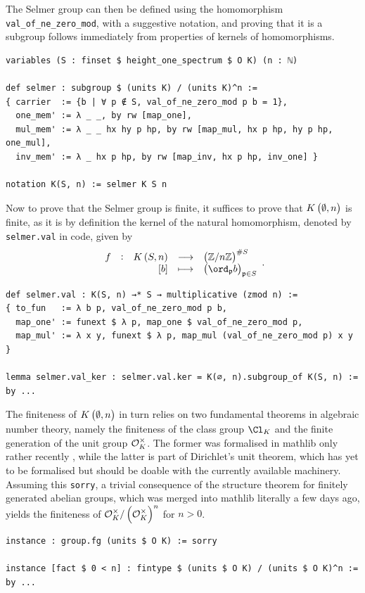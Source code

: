 \pagebreak

The Selmer group can then be defined using the homomorphism \texttt{val\_of\_ne\_zero\_mod}, with a suggestive notation, and proving that it is a subgroup follows immediately from properties of kernels of homomorphisms.

\begin{lstlisting}[frame=single]
variables (S : finset $ height_one_spectrum $ O K) (n : ℕ)

def selmer : subgroup $ (units K) / (units K)^n :=
{ carrier  := {b | ∀ p ∉ S, val_of_ne_zero_mod p b = 1},
  one_mem' := λ _ _, by rw [map_one],
  mul_mem' := λ _ _ hx hy p hp, by rw [map_mul, hx p hp, hy p hp, one_mul],
  inv_mem' := λ _ hx p hp, by rw [map_inv, hx p hp, inv_one] }

notation K(S, n) := selmer K S n
\end{lstlisting}

Now to prove that the Selmer group is finite, it suffices to prove that $ K\br{\emptyset, n} $ is finite, as it is by definition the kernel of the natural homomorphism, denoted by \texttt{selmer.val} in code, given by
$$ \function[f]{K\br{S, n}}{\br{\ZZ / n\ZZ}^{\#S}}{\sbr{b}}{\br{\ord_\ppp b}_{\ppp \in S}}. $$

\begin{lstlisting}[frame=single]
def selmer.val : K(S, n) →* S → multiplicative (zmod n) :=
{ to_fun   := λ b p, val_of_ne_zero_mod p b,
  map_one' := funext $ λ p, map_one $ val_of_ne_zero_mod p,
  map_mul' := λ x y, funext $ λ p, map_mul (val_of_ne_zero_mod p) x y }

lemma selmer.val_ker : selmer.val.ker = K(∅, n).subgroup_of K(S, n) := by ...
\end{lstlisting}

The finiteness of $ K\br{\emptyset, n} $ in turn relies on two fundamental theorems in algebraic number theory, namely the finiteness of the class group $ \Cl_K $ and the finite generation of the unit group $ \mathcal{O}_K^\times $. The former was formalised in mathlib only rather recently \cite{BDNN21}, while the latter is part of Dirichlet's unit theorem, which has yet to be formalised but should be doable with the currently available machinery. Assuming this \texttt{sorry}, a trivial consequence of the structure theorem for finitely generated abelian groups, which was merged into mathlib literally a few days ago, yields the finiteness of $ \OOO_K^\times / \br{\OOO_K^\times}^n $ for $ n > 0 $.

\begin{lstlisting}[frame=single]
instance : group.fg (units $ O K) := sorry

instance [fact $ 0 < n] : fintype $ (units $ O K) / (units $ O K)^n := by ...
\end{lstlisting}

